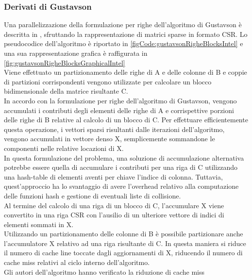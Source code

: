 \subsubsection{Derivati di Gustavson} \label{ssec:gustavsonDerivate}
Una parallelizzazione della formulazione per righe dell'algoritmo di Gustavson è
descritta in \cite{intelSpMMDenseAccumulator}, sfruttando la
rappresentazione di matrici sparse in formato CSR.  \label{ssec:intelSpMMDenseAccumulator}
Lo pseudocodice dell'algoritmo è riportato in \ref{figCode:gustavsonRigheBlocksIntel}
e una sua rappresentazione grafica è raffigurata in
\ref{fig:gustavsonRigheBlocksGraphicalIntel}\\
Viene effettuato un partizionamento delle righe di A e delle colonne di B e 
coppie di partizioni corrispondenti vengono utilizzate per calcolare un
blocco bidimensionale della matrice risultante C.\\
In accordo con la formulazione per righe dell'algoritmo di Gustavson, vengono
accumulati i contributi degli elementi \nnz delle righe di A e corrispettive porzioni
delle righe di B relative al calcolo di un blocco di C. 
Per effettuare efficientemente questa operazione, i vettori sparsi risultanti
dalle iterazioni dell'algoritmo, vengono accumulati in vettore denso X, 
semplicemente sommandone le componenti \nnz nelle relative locazioni di X.\\
In questa formulazione del problema, una soluzione di accumulazione 
alternativa potrebbe essere quella di accumulare i contributi per una riga di C 
utilizzando una hash-table di elementi aventi per chiave l'indice di colonna. 
Tuttavia, quest'approccio ha lo svantaggio di avere l'overhead relativo alla 
computazione delle funzioni hash e gestione di eventuali liste di collisione.\\
Al termine del calcolo di una riga di un blocco di C, l'accumulare X viene
convertito in una riga CSR con l'ausilio di un ulteriore vettore di indici di
elementi \nnz sommati in X.\\
Utilizzando un partizionamento delle colonne di B è possibile partizionare anche
l'accumulatore X relativo ad una riga risultante di C. In questa maniera si
riduce il numero di cache line toccate dagli aggiornamenti di X, riducendo il
numero di cache miss relativi al ciclo interno dell'algoritmo.\\
Gli autori dell'algoritmo hanno verificato la riduzione di cache miss
